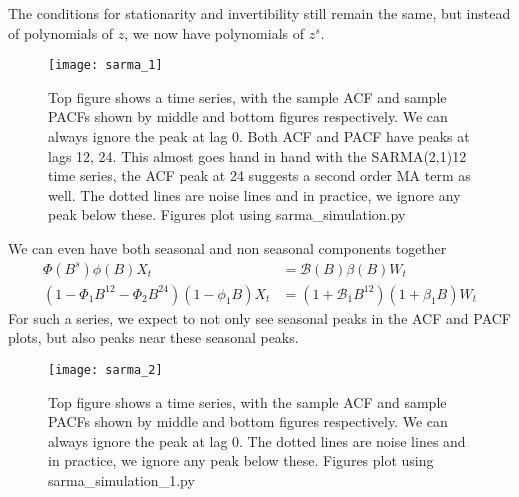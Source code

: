 \documentclass[../../time_series_notes.tex]{subfiles}
\begin{document}
The conditions for stationarity and invertibility still remain the same, but instead of polynomials of $z$, we now have polynomials of $z^{s}$.

\begin{figure}[h]
    \texttt{[image: sarma\_1]}
    \centering
    \caption {Top figure shows a time series, with the sample ACF and sample PACFs shown by middle and bottom figures respectively. We can always ignore the peak at lag 0. Both ACF and PACF have peaks at lags 12, 24. This almost goes hand in hand with the SARMA(2,1)12 time series, the ACF peak at 24 suggests a second order MA term as well. The dotted lines are noise lines and in practice, we ignore any peak below these. Figures plot using sarma\_simulation.py}
    \label{fig:sarma_1} %
\end{figure}

We can even have both seasonal and non seasonal components together
\begin{align*}
    \Phi(B^{s})\phi(B)X_{t} &= \mathcal{B}(B)\beta(B)W_{t}\\
    (1 - \Phi_{1}B^{12} - \Phi_{2}B^{24})(1 - \phi_{1}B)X_{t} &= (1 + \mathcal{B}_{1}B^{12})(1 + \beta_{1}B)W_{t}
\end{align*}
For such a series, we expect to not only see seasonal peaks in the ACF and PACF plots, but also peaks near these seasonal peaks.

\begin{figure}[h]
    \texttt{[image: sarma\_2]}
    \centering
    \caption {Top figure shows a time series, with the sample ACF and sample PACFs shown by middle and bottom figures respectively. We can always ignore the peak at lag 0. The dotted lines are noise lines and in practice, we ignore any peak below these. Figures plot using sarma\_simulation\_1.py}
    \label{fig:sarma_2} %
\end{figure}
\end{document}
